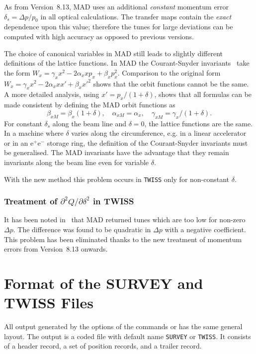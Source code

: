 As from Version~8.13, MAD uses an additional {\em constant} momentum
error \(\delta_s = \Delta p/p_0\) in all optical calculations.
The transfer maps contain the {\em exact} dependence upon this value;
therefore the tunes for large deviations can be computed with high
accuracy as opposed to previous versions.

The choice of canonical variables in MAD still
leads to slightly different definitions of the lattice functions.
In MAD the Courant-Snyder invariants~\cite{B-COU58}
take the form
\(W_x = \gamma_x x^2 - 2 \alpha_x x p_x + \beta_x p_x^2\).
Comparison to the original form
\(W_x = \gamma_x x^2 - 2 \alpha_x x x' + \beta_x x'^2\)
shows that the orbit functions cannot be the same.
A more detailed analysis, using \(x' = p_x / (1 + \delta)\),
shows that all formulas can be made consistent
by defining the MAD orbit functions as
\[
\beta_{xM} = \beta_x (1 + \delta) , \quad
\alpha_{xM} = \alpha_x , \quad
\gamma_{xM} = \gamma_x / (1 + \delta).
\]
For constant \(\delta_s\) along the beam line and \(\delta = 0\),
the lattice functions are the same.
In a machine where \(\delta\) varies along the circumference, e.g. in a
linear accelerator or in an e{}\(^+\)e\({}^-\) storage ring,
the definition of the
Courant-Snyder invariants must be generalised.
The MAD invariants have the advantage that they
remain invariants along the beam line even for variable \(\delta\).

With the new method this problem occurs in {\tt TWISS} only for
non-constant \(\delta\).

\subsection{Treatment of $\partial^2Q/\partial\delta^2$ in TWISS}
\label{S-treat}
It has been noted in~\cite{B-RUGGIERO} that MAD returned tunes which
are too low for non-zero \(\Delta p\).
The difference was found to be quadratic in \(\Delta p\) with a
negative coefficient.
This problem has been eliminated thanks to the new treatment 
of momentum errors from Version~8.13 onwards.

\appendix
\chapter{Format of the SURVEY and TWISS Files}
\label{A-TAPE3}
All output generated by the  options of the commands
 or  has the same general layout.
The output is a coded file with default name {\tt SURVEY} or {\tt TWISS}.
It consists of a header record,
a set of position records,
and a trailer record.
